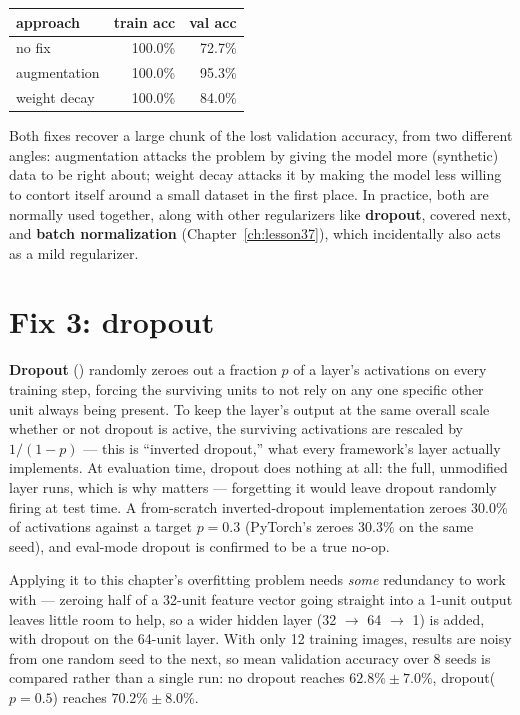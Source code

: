 \begin{center}
\renewcommand{\arraystretch}{1.3}
\begin{tabular}{lrr}
\hline
\textbf{approach} & \textbf{train acc} & \textbf{val acc} \\
\hline
no fix       & 100.0\% & 72.7\% \\
augmentation & 100.0\% & 95.3\% \\
weight decay & 100.0\% & 84.0\% \\
\hline
\end{tabular}
\end{center}

Both fixes recover a large chunk of the lost validation accuracy, from two different angles: augmentation attacks the problem by giving the model more (synthetic) data to be right about; weight decay attacks it by making the model less willing to contort itself around a small dataset in the first place. In practice, both are normally used together, along with other regularizers like \textbf{dropout}, covered next, and \textbf{batch normalization} (Chapter~\ref{ch:lesson37}), which incidentally also acts as a mild regularizer.

\section{Fix 3: dropout}

\textbf{Dropout} () randomly zeroes out a fraction $p$ of a layer's activations on every training step, forcing the surviving units to not rely on any one specific other unit always being present. To keep the layer's output at the same overall scale whether or not dropout is active, the surviving activations are rescaled by $1/(1-p)$ --- this is ``inverted dropout,'' what every framework's  layer actually implements. At evaluation time, dropout does nothing at all: the full, unmodified layer runs, which is why  matters --- forgetting it would leave dropout randomly firing at test time. A from-scratch inverted-dropout implementation zeroes $30.0\%$ of activations against a target $p=0.3$ (PyTorch's  zeroes $30.3\%$ on the same seed), and eval-mode dropout is confirmed to be a true no-op.

Applying it to this chapter's overfitting problem needs \emph{some} redundancy to work with --- zeroing half of a 32-unit feature vector going straight into a 1-unit output leaves little room to help, so a wider hidden layer (32 $\to$ 64 $\to$ 1) is added, with dropout on the 64-unit layer. With only 12 training images, results are noisy from one random seed to the next, so mean validation accuracy over 8 seeds is compared rather than a single run: no dropout reaches $62.8\%\pm7.0\%$, dropout($p=0.5$) reaches $70.2\%\pm8.0\%$.

